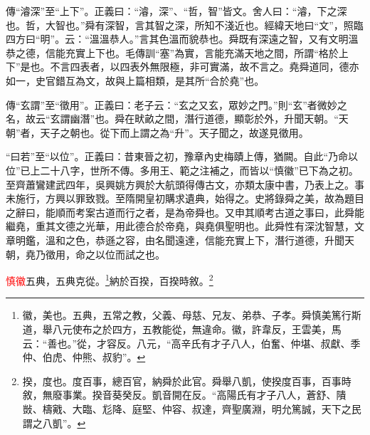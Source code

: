 {\noindent\zhuan{}\fzbyks 傳“濬深”至“上下”。正義曰：“濬，深”、“哲，智”皆文。舍人曰：“濬，下之深也。哲，大智也。”舜有深智，言其智之深，所知不淺近也。經緯天地曰“文”，照臨四方曰“明”。云：“溫溫恭人。”言其色溫而貌恭也。舜既有深遠之智，又有文明溫恭之德，信能充實上下也。毛傳訓“塞”為實，言能充滿天地之間，所謂“格於上下”是也。不言四表者，以四表外無限極，非可實滿，故不言之。堯舜道同，德亦如一，史官錯互為文，故與上篇相類，是其所“合於堯”也。 \par}

{\noindent\zhuan{}\fzbyks 傳“玄謂”至“徵用”。正義曰：老子云：“玄之又玄，眾妙之門。”則“玄”者微妙之名，故云“玄謂幽潛”也。舜在畎畝之間，潛行道德，顯彰於外，升聞天朝。“天朝”者，天子之朝也。從下而上謂之為“升”。天子聞之，故遂見徵用。 \par}

{\noindent\shu{}\fzkt “曰若”至“以位”。正義曰：昔東晉之初，豫章內史梅賾上傳，猶闕。自此“乃命以位”已上二十八字，世所不傳。多用王、範之注補之，而皆以“慎徽”已下為之初。至齊蕭鸞建武四年，吳興姚方興於大航頭得傳古文，亦類太康中書，乃表上之。事未施行，方興以罪致戮。至隋開皇初購求遺典，始得之。史將錄舜之美，故為題目之辭曰，能順而考案古道而行之者，是為帝舜也。又申其順考古道之事曰，此舜能繼堯，重其文德之光華，用此德合於帝堯，與堯俱聖明也。此舜性有深沈智慧，文章明鑑，溫和之色，恭遜之容，由名聞遠達，信能充實上下，潛行道德，升聞天朝，堯乃徵用，命之以位而試之也。 \par}

\textcolor{red}{慎徽}五典，五典克從。\footnote{徽，美也。五典，五常之教，父義、母慈、兄友、弟恭、子孝。舜慎美篤行斯道，舉八元使布之於四方，五教能從，無違命。徽，許韋反，王雲美，馬云：“善也。”從，才容反。八元，“高辛氏有才子八人，伯奮、仲堪、叔獻、季仲、伯虎、仲熊、叔豹”。}納於百揆，百揆時敘。\footnote{揆，度也。度百事，總百官，納舜於此官。舜舉八凱，使揆度百事，百事時敘，無廢事業。揆音葵癸反。凱音開在反。“高陽氏有才子八人，蒼舒、隤敱、檮戭、大臨、尨降、庭堅、仲容、叔達，齊聖廣淵，明允篤誠，天下之民謂之八凱”。}

